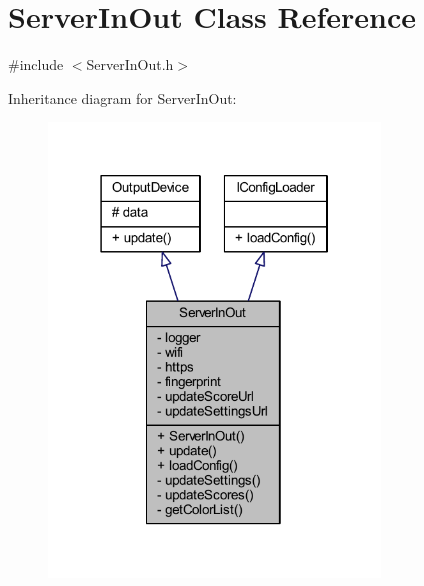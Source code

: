 \hypertarget{class_server_in_out}{}\section{Server\+In\+Out Class Reference}
\label{class_server_in_out}


{\ttfamily \#include $<$Server\+In\+Out.\+h$>$}



Inheritance diagram for Server\+In\+Out\+:
\nopagebreak
\begin{figure}[H]
\begin{center}
\leavevmode
\includegraphics[width=250pt]{class_server_in_out__inherit__graph}
\end{center}
\end{figure}



